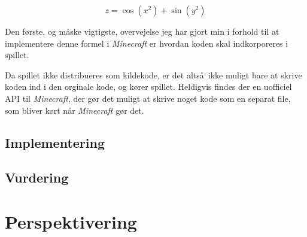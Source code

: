 \documentclass[a4paper,12pt]{report}
\begin{document}
		\[z = \cos (x^2) + \sin (y^2)\]

		Den f\o rste, og m\aa ske vigtigste, overvejelse jeg har gjort min i forhold til at implementere denne formel i \emph{Minecraft}
		er hvordan koden skal indkorporeres i spillet.

		Da spillet ikke distribueres som kildekode, er det alts\aa \ ikke muligt bare at skrive koden ind i den orginale kode, og k\o rer spillet.
		Heldigvis findes der en uofficiel API til \emph{Minecraft}, der g\o r det muligt at skrive noget kode som en separat file, som bliver k\o rt
		n\aa r \emph{Minecraft} g\o r det.
	\subsection{Implementering}
	\subsection{Vurdering}
	\section{Perspektivering}
\end{document}
